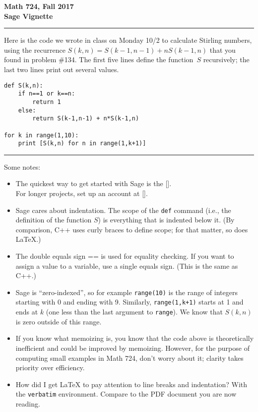 


\textbf{Math 724, Fall 2017\\ Sage Vignette}
\bigskip\hrule

Here is the code we wrote in class on Monday 10/2 to calculate Stirling numbers, using the recurrence $S(k,n)=S(k-1,n-1)+nS(k-1,n)$ that you found in problem \#134.  The first five lines define the function~$S$ recursively; the last two lines print out several values.

\begin{verbatim}
def S(k,n):
    if n==1 or k==n:
        return 1
    else:
        return S(k-1,n-1) + n*S(k-1,n)

for k in range(1,10):
    print [S(k,n) for n in range(1,k+1)]
\end{verbatim}

\bigskip\hrule

Some notes:
\begin{itemize}
\item The quickest  way to get started with Sage is the  [].\\  For longer projects, set up an account at  [].\\
\item Sage cares about indentation.  The scope of the \verb+def+ command (i.e., the definition of the function $S$) is everything that is indented below it.  (By comparison, C++ uses curly braces to define scope; for that matter, so does LaTeX.)\\
\item The double equals sign == is used for equality checking.  If you want to assign a value to a variable, use a single equals sign.  (This is the same as C++.)\\
\item Sage is ``zero-indexed'', so for example \verb+range(10)+ is the range of integers starting with 0 and ending with 9.  Similarly, \verb^range(1,k+1)^ starts at 1 and ends at $k$ (one less than the last argument to \verb+range+).  We know that $S(k,n)$ is zero outside of this range.\\
\item If you know what memoizing is, you know that the code above is theoretically inefficient and could be improved by memoizing.  However, for the purpose of computing small examples in Math 724, don't worry about it; clarity takes priority over efficiency.\\
\item How did I get LaTeX to pay attention to line breaks and indentation?
With the {\tt verbatim} environment.  Compare  to the PDF document you are now reading.
\end{itemize}


